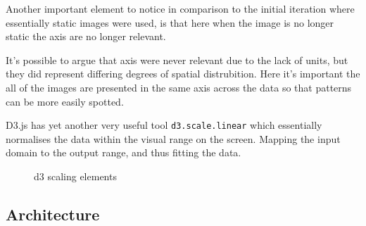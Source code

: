 \documentclass[a4paper,11pt,titlepage]{article}
\begin{document}
	
		\begin{figure}[H]
    			\centering	
    			\qquad
    			\caption{}%
    			\label{fig:epoch_layer}
	\end{figure}
	
	Another important element to notice in comparison to the initial iteration where essentially static images were used, is that here when the image is no longer static the axis are no longer relevant.
	\par 
	It's possible to argue that axis were never relevant due to the lack of units, but they did represent differing degrees of spatial distrubition. Here it's important the all of the images are presented in the same axis across the data so that patterns can be more easily spotted. 
	\par 
	D3.js has yet another very useful tool \texttt{d3.scale.linear} which essentially normalises the data within the visual range on the screen. Mapping the input domain to the output range, and thus fitting the data.
	\begin{figure}[H]
    			\caption{d3 scaling elements}%
	\end{figure}	
		
	\subsection{Architecture}
	
\end{document}
